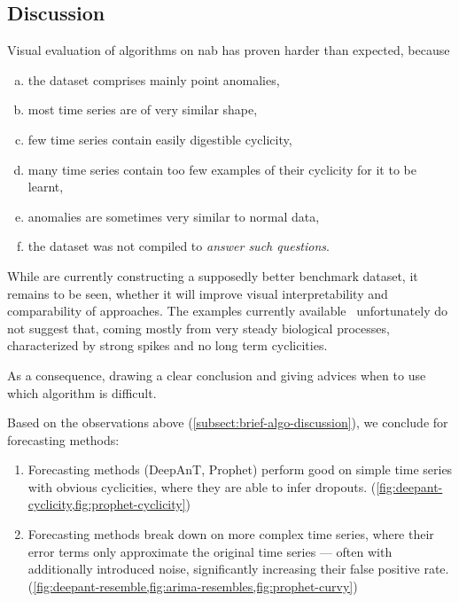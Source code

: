 \subsection{Discussion}\label{subsect:discussion}
Visual evaluation of algorithms on \gls{nab} has proven harder than expected,
because
\begin{enumerate}[a.)]
    \item the dataset comprises mainly point anomalies,
    \item most time series are of very similar shape,
    \item few time series contain easily digestible cyclicity,
    \item many time series contain too few examples of their cyclicity for it to be learnt,
    \item anomalies are sometimes very similar to normal data,
    \item the dataset was not compiled to \textit{answer such questions}.
\end{enumerate}
While \textcite{Renjie.2020} are currently constructing a supposedly better
benchmark dataset, it remains to be seen, whether it will improve visual
interpretability and comparability of approaches. The examples currently available~\cite{Renjie.2021}
unfortunately do not suggest that, coming mostly from very steady biological processes,
characterized by strong spikes and no long term cyclicities.

As a consequence, drawing a clear conclusion and giving advices when to use
which algorithm is difficult.

Based on the observations above (\cref{subsect:brief-algo-discussion}), we conclude
for forecasting methods:
\begin{enumerate}
    \item Forecasting methods (DeepAnT, Prophet) perform good on simple time series
    with obvious cyclicities, where they are able to infer dropouts. (\cref{fig:deepant-cyclicity,fig:prophet-cyclicity})
    \item Forecasting methods break down on more complex time series, where their
    error terms only approximate the original time series --- often with additionally
    introduced noise, significantly increasing their false positive rate. (\cref{fig:deepant-resemble,fig:arima-resembles,fig:prophet-curvy})
\end{enumerate}

